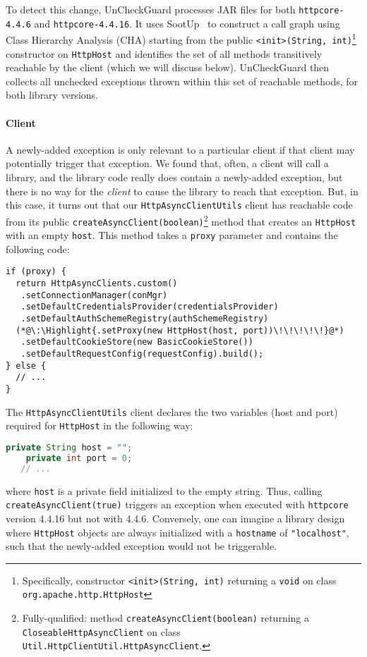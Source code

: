 To detect this change, UnCheckGuard processes JAR files for both \texttt{httpcore-4.4.6} and \texttt{httpcore-4.4.16}. It uses SootUp~\cite{Karakaya24:_sootup} to construct a call graph using Class Hierarchy Analysis (CHA) starting from the public \texttt{<init>(String, int)}\footnote{Specifically, constructor \texttt{<init>(String, int)} returning a \texttt{void} on class \texttt{org.apache.http.HttpHost}} constructor on \texttt{HttpHost} and identifies the set of all methods transitively reachable by the client (which we will discuss below). UnCheckGuard then collects all unchecked exceptions thrown within this set of reachable methods, for both library versions.

\paragraph{Client} 
A newly-added exception is only relevant to a particular client if that client may
potentially trigger that exception. We found that, often, a client will call a library,
and the library code really does contain a newly-added exception, but there is no way for
the \emph{client} to cause the library to reach that exception.
But, in this case, it turns out that
our \texttt{HttpAsyncClientUtils} client has reachable code from its public \texttt{createAsyncClient(boolean)}\footnote{Fully-qualified: method \texttt{createAsyncClient(boolean)} returning a \texttt{CloseableHttpAsyncClient} on class \texttt{Util.HttpClientUtil.HttpAsyncClient}.} method
that creates an \texttt{HttpHost} with an empty \texttt{host}. This
method takes a \texttt{proxy}
parameter and contains the following code:
\begin{lstlisting}[style=javacode]
if (proxy) {
  return HttpAsyncClients.custom()
   .setConnectionManager(conMgr)
   .setDefaultCredentialsProvider(credentialsProvider)
   .setDefaultAuthSchemeRegistry(authSchemeRegistry)
  (*@\:\Highlight{.setProxy(new HttpHost(host, port))\!\!\!\!\!}@*)
   .setDefaultCookieStore(new BasicCookieStore())
   .setDefaultRequestConfig(requestConfig).build();
} else {
  // ...
}
\end{lstlisting}

The \texttt{HttpAsyncClientUtils} client declares the two variables (host and port) required for \texttt{HttpHost} in the following way:
\begin{lstlisting}[language=Java,basicstyle=\scriptsize\ttfamily]
    private String host = "";
    private int port = 0;
   // ...
\end{lstlisting}
where \texttt{host} is a private field initialized to the empty string.
Thus, calling \texttt{createAsyncClient(true)} triggers an exception when executed with
\texttt{httpcore} version 4.4.16 but not with 4.4.6. Conversely, one can imagine a library design
where \texttt{HttpHost} objects are always initialized with a \texttt{hostname} of \texttt{"localhost"},
such that the newly-added exception would not be triggerable.

